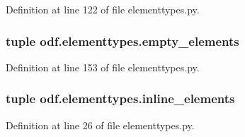 Definition at line 122 of file elementtypes.\+py.

\hypertarget{namespaceodf_1_1elementtypes_ad5a29e22e6077343a8348bc3d1b13068}{
\subsubsection[{empty\+\_\+elements}]{\setlength{\rightskip}{0pt plus 5cm}tuple odf.\+elementtypes.\+empty\+\_\+elements}}\label{namespaceodf_1_1elementtypes_ad5a29e22e6077343a8348bc3d1b13068}


Definition at line 153 of file elementtypes.\+py.

\hypertarget{namespaceodf_1_1elementtypes_af6af3ee74d3bbcd994b62e093d66efce}{
\subsubsection[{inline\+\_\+elements}]{\setlength{\rightskip}{0pt plus 5cm}tuple odf.\+elementtypes.\+inline\+\_\+elements}}\label{namespaceodf_1_1elementtypes_af6af3ee74d3bbcd994b62e093d66efce}


Definition at line 26 of file elementtypes.\+py.

